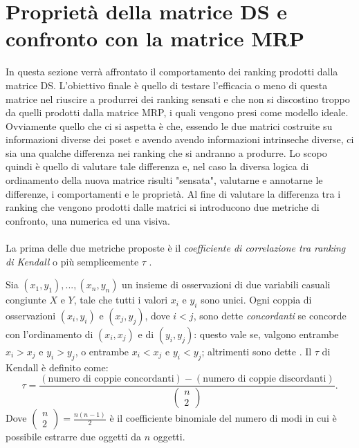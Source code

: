 \documentclass{report}
\begin{document}
\chapter{Proprietà della matrice DS e confronto con la matrice MRP}
In questa sezione verrà affrontato il comportamento dei ranking prodotti dalla matrice DS. L'obiettivo finale è quello di testare l'efficacia o meno di questa matrice nel riuscire a produrrei dei ranking sensati e che non si discostino troppo da quelli prodotti dalla matrice MRP, i quali vengono presi come modello ideale. Ovviamente quello che ci si aspetta è che, essendo le due matrici costruite su informazioni diverse dei poset e avendo avendo informazioni intrinseche diverse, ci sia una qualche differenza nei ranking che si andranno a produrre. Lo scopo quindi è quello di valutare tale differenza e, nel caso la diversa logica di ordinamento della nuova matrice risulti "sensata", valutarne e annotarne le differenze, i comportamenti e le proprietà. Al fine di valutare la differenza tra i ranking che vengono prodotti dalle matrici si introducono due metriche di confronto, una numerica ed una visiva.
\\~\\
La prima delle due metriche proposte è il \textit{coefficiente di correlazione tra ranking di Kendall} o più semplicemente $\tau$ .

\begin{definition}
Sia $(x_1,y_1), ...,(x_n,y_n)$ un insieme di osservazioni di due variabili casuali congiunte $X$ e $Y$, tale che tutti i valori $x_i$ e $y_i$ sono unici. Ogni coppia di osservazioni $(x_i,y_i)$ e $(x_j,y_j)$, dove $i<j$, sono dette \textit{concordanti} se concorde con l'ordinamento di $(x_i,x_j)$ e di $(y_i,y_j)$: questo vale se, valgono entrambe $x_i>x_j$ e $y_i>y_j$, o entrambe $x_i<x_j$ e $y_i<y_j$; altrimenti sono dette .
Il $\tau$ di Kendall è definito come:
\[\tau = \frac{(\textrm{numero di coppie concordanti})-(\textrm{numero di coppie discordanti})}{\left( \begin{array}{c} n\\ 2 \end{array} \right)}.\]
Dove $\left( \begin{array}{c} n\\ 2 \end{array} \right)=\frac{n(n-1)}{2}$ è il coefficiente binomiale del numero di modi in cui è possibile estrarre due oggetti da $n$ oggetti.
\end{definition}
\end{document}
